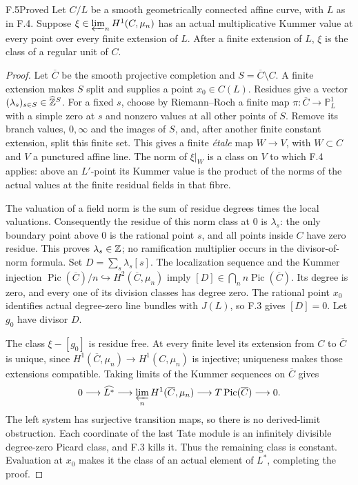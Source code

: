 \begin{claim}{F.5}{Proved}
Let $C/L$ be a smooth geometrically connected affine curve, with $L$
as in F.4. Suppose $\xi\in\varprojlim_n H^1(C,\mu_n)$ has an
actual multiplicative Kummer value at every point over every finite
extension of $L$. After a finite extension of $L$, $\xi$ is the
class of a regular unit of $C$.
\end{claim}
\begin{proof}
Let $\overline C$ be the smooth projective completion and
$S=\overline C\setminus C$. A finite extension makes $S$ split and
supplies a point $x_0\in C(L)$. Residues give a vector
$(\lambda_s)_{s\in S}\in\widehat{\mathbb Z}^S$. For a fixed $s$, choose
by Riemann--Roch a finite map
$\pi:\overline C\to\mathbb P^1_L$ with a simple zero at $s$ and
nonzero values at all other points of $S$. Remove its branch values,
$0,\infty$ and the images of $S$, and, after another finite constant
extension, split this finite set. This gives a finite \emph{\'etale}
map $W\to V$, with $W\subset C$ and $V$ a punctured affine line.
The norm of $\xi|_W$ is a class on $V$ to which F.4 applies: above
an $L'$-point its Kummer value is the product of the norms of the
actual values at the finite residual fields in that fibre.

The valuation of a field norm is the sum of residue degrees times
the local valuations. Consequently the residue of this norm class
at $0$ is $\lambda_s$: the only boundary point above $0$ is the
rational point $s$, and all points inside $C$ have zero residue.
This proves $\lambda_s\in\mathbb Z$; no ramification multiplier occurs
in the divisor-of-norm formula. Set $D=\sum_s\lambda_s[s]$.
The localization sequence and the Kummer injection
$\operatorname{Pic}(\overline C)/n\hookrightarrow
H^2(\overline C,\mu_n)$ imply
$[D]\in\bigcap_n n\operatorname{Pic}(\overline C)$. Its degree
is zero, and every one of its division classes has degree zero.
The rational point $x_0$ identifies actual degree-zero line bundles
with $J(L)$, so F.3 gives $[D]=0$. Let $g_0$ have divisor $D$.

The class $\xi-[g_0]$ is residue free. At every finite level its
extension from $C$ to $\overline C$ is unique, since
$H^1(\overline C,\mu_n)\to H^1(C,\mu_n)$ is injective; uniqueness
makes those extensions compatible. Taking limits of the Kummer
sequences on $\overline C$ gives
\[
0\longrightarrow\widehat{L^*}\longrightarrow
\varprojlim_n H^1(\overline C,\mu_n)
\longrightarrow T\operatorname{Pic}(\overline C)
\longrightarrow0.
\]
The left system has surjective transition maps, so there is no
derived-limit obstruction. Each coordinate of the last Tate module
is an infinitely divisible degree-zero Picard class, and F.3 kills
it. Thus the remaining class is constant. Evaluation at $x_0$ makes
it the class of an actual element of $L^*$, completing the proof.
\end{proof}

